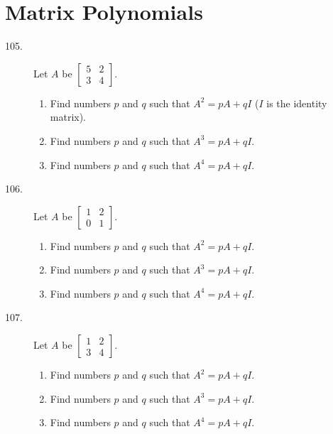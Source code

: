 \documentclass{article}
\begin{document}
\newpage

\section{Matrix Polynomials}

\begin{description}

  \item[105.] Let $A$ be $\begin{bmatrix} 5 & 2 \\ 3 & 4 \end{bmatrix}$.
    \begin{enumerate}[\hspace{1cm}(a)]
      \item Find numbers $p$ and $q$ such that $A^2 = pA+qI$ ($I$ is the identity matrix).
      \item Find numbers $p$ and $q$ such that $A^3 = pA+qI$.
      \item Find numbers $p$ and $q$ such that $A^4 = pA+qI$.
    \end{enumerate}

  \item[106.] Let $A$ be $\begin{bmatrix} 1 & 2 \\ 0 & 1 \end{bmatrix}$.
    \begin{enumerate}[\hspace{1cm}(a)]
      \item Find numbers $p$ and $q$ such that $A^2 = pA+qI$.
      \item Find numbers $p$ and $q$ such that $A^3 = pA+qI$.
      \item Find numbers $p$ and $q$ such that $A^4 = pA+qI$.
    \end{enumerate}

  \item[107.] Let $A$ be $\begin{bmatrix} 1 & 2 \\ 3 & 4 \end{bmatrix}$.
    \begin{enumerate}[\hspace{1cm}(a)]
      \item Find numbers $p$ and $q$ such that $A^2 = pA+qI$.
      \item Find numbers $p$ and $q$ such that $A^3 = pA+qI$.
      \item Find numbers $p$ and $q$ such that $A^4 = pA+qI$.
    \end{enumerate}


\end{description}
\end{document}
